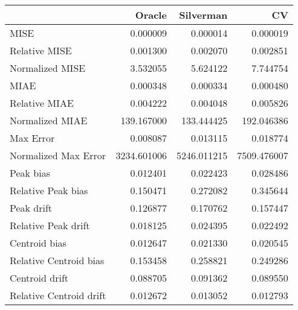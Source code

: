 \begin{tabular}{lrrr}
  \hline
 & Oracle & Silverman & CV \\ 
  \hline
MISE & 0.000009 & 0.000014 & 0.000019 \\ 
  Relative MISE & 0.001300 & 0.002070 & 0.002851 \\ 
  Normalized MISE & 3.532055 & 5.624122 & 7.744754 \\ 
  MIAE & 0.000348 & 0.000334 & 0.000480 \\ 
  Relative MIAE & 0.004222 & 0.004048 & 0.005826 \\ 
  Normalized MIAE & 139.167000 & 133.444425 & 192.046386 \\ 
  Max Error & 0.008087 & 0.013115 & 0.018774 \\ 
  Normalized Max Error & 3234.601006 & 5246.011215 & 7509.476007 \\ 
  Peak bias & 0.012401 & 0.022423 & 0.028486 \\ 
  Relative Peak bias & 0.150471 & 0.272082 & 0.345644 \\ 
  Peak drift & 0.126877 & 0.170762 & 0.157447 \\ 
  Relative Peak drift & 0.018125 & 0.024395 & 0.022492 \\ 
  Centroid bias & 0.012647 & 0.021330 & 0.020545 \\ 
  Relative Centroid bias & 0.153458 & 0.258821 & 0.249286 \\ 
  Centroid drift & 0.088705 & 0.091362 & 0.089550 \\ 
  Relative Centroid drift & 0.012672 & 0.013052 & 0.012793 \\ 
   \hline
\end{tabular}
